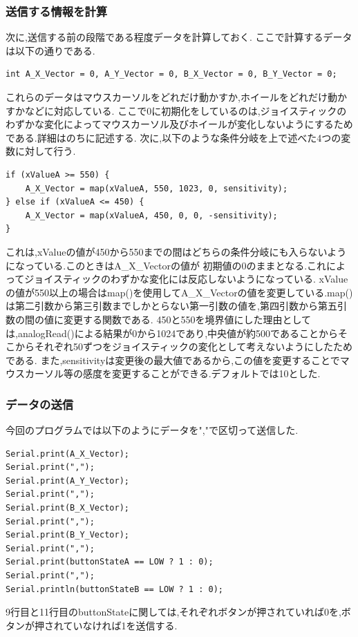 \documentclass[dvipdfmx]{jarticle}
\begin{document}
\subsubsection{送信する情報を計算}
次に,送信する前の段階である程度データを計算しておく.
ここで計算するデータは以下の通りである.
\begin{lstlisting}
int A_X_Vector = 0, A_Y_Vector = 0, B_X_Vector = 0, B_Y_Vector = 0;
\end{lstlisting}
これらのデータはマウスカーソルをどれだけ動かすか,ホイールをどれだけ動かすかなどに対応している.
ここで0に初期化をしているのは,ジョイスティックのわずかな変化によってマウスカーソル及びホイールが変化しないようにするためである.詳細はのちに記述する.
次に,以下のような条件分岐を上で述べた4つの変数に対して行う.
\begin{lstlisting}
if (xValueA >= 550) {
    A_X_Vector = map(xValueA, 550, 1023, 0, sensitivity);
} else if (xValueA <= 450) {
    A_X_Vector = map(xValueA, 450, 0, 0, -sensitivity);
}
\end{lstlisting}
これは,xValueの値が450から550までの間はどちらの条件分岐にも入らないようになっている.このときはA\_X\_Vectorの値が
初期値の0のままとなる.これによってジョイスティックのわずかな変化には反応しないようになっている.
xValueの値が550以上の場合はmap()を使用してA\_X\_Vectorの値を変更している.map()は第二引数から第三引数までしかとらない第一引数の値を,第四引数から第五引数の間の値に変更する関数である.\cite{4}
450と550を境界値にした理由としては,analogRead()による結果が0から1024であり,中央値が約500であることからそこからそれぞれ50ずつをジョイスティックの変化として考えないようにしたためである.
また,sensitivityは変更後の最大値であるから,この値を変更することでマウスカーソル等の感度を変更することができる.デフォルトでは10とした.
\subsubsection{データの送信}
今回のプログラムでは以下のようにデータを","で区切って送信した.
\begin{lstlisting}
Serial.print(A_X_Vector);
Serial.print(",");
Serial.print(A_Y_Vector);
Serial.print(",");
Serial.print(B_X_Vector);
Serial.print(",");
Serial.print(B_Y_Vector);
Serial.print(",");
Serial.print(buttonStateA == LOW ? 1 : 0); 
Serial.print(",");
Serial.println(buttonStateB == LOW ? 1 : 0);
\end{lstlisting}
9行目と11行目のbuttonStateに関しては,それぞれボタンが押されていれば0を,ボタンが押されていなければ1を送信する.
\end{document}
